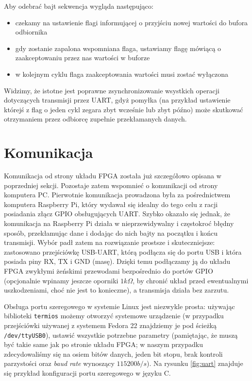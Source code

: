 Aby odebrać bajt sekwencja wygląda następująco:
\begin{itemize}
  \item czekamy na ustawienie flagi informującej o przyjściu nowej wartości do bufora odbiornika
  \item gdy zostanie zapalona wspomniana flaga, ustawiamy flagę mówiącą o zaakceptowaniu przez nas wartości w buforze
  \item w kolejnym cyklu flaga zaakceptowania wartości musi zostać wyłączona
\end{itemize}

Widzimy, że istotne jest poprawne zsynchronizowanie wsystkich operacji dotyczących transmisji przez UART, gdyż pomyłka (na przykład ustawienie którejś z flag o jeden cykl zegara zbyt wcześnie lub zbyt późno) może skutkować otrzymaniem przez odbiorcę zupełnie przekłamanych danych.

\section{Komunikacja}

Komunikacja od strony układu FPGA została już szczegółowo opisana w poprzedniej sekcji. Pozostaje zatem wspomnieć o komunikacji od strony komputera PC. Pierwotnie komunikacja prowadzona była za pośrednictwem komputera Raspberry Pi, który wydawał się idealny do tego celu z racji posiadania złącz GPIO obsługujących UART. Szybko okazało się jednak, że komunikacja na Raspberry Pi działa w nieprzewidywalny i częstokroć błędny sposób, przekłamując dane i dodając do nich bajty na początku i końcu transmisji. Wybór padł zatem na rozwiązanie prostsze i skuteczniejsze: zastosowano przejściówkę USB-UART, którą podłącza się do portu USB i która posiada piny RX, TX i GND (masę). Dzięki temu podłączamy ją do układu FPGA zwykłymi żeńskimi przewodami bezpośrednio do portów GPIO (opcjonalnie wpinamy jeszcze oporniki $1k\Omega $, by chronić układ przed ewentualnymi uszkodzeniami, choć nie jest to konieczne), a transmisja działa bez zarzutu.

Obsługa portu szeregowego w systemie Linux jest niezwykle prosta: używając biblioteki \texttt{termios} możemy otworzyć systemowe urządzenie (w przypadku przejściówki używanej z systemem Fedora 22 znajdziemy je pod ścieżką \texttt{/dev/ttyUSB0}), ustawić wszystkie potrzebne parametry (pamiętając, że muszą być takie same jak po stronie układu FPGA; w naszym przypadku zdecydowaliśmy się na osiem bitów danych, jeden bit stopu, brak kontroli parzystości oraz \textit{baud rate} wynoszący $115200 b/s$). Na rysunku \ref{fig:uart} znajduje się przykład konfiguracji portu szeregowego w języku C.

